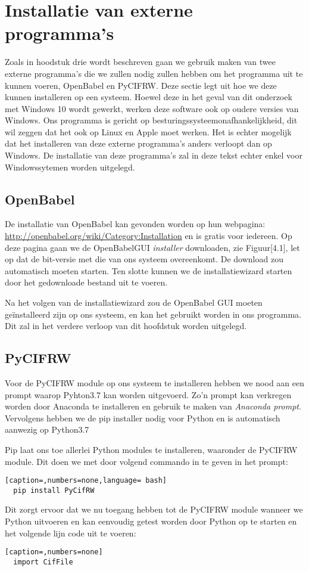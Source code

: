 \section{Installatie van externe programma's}
Zoals in hoodstuk drie wordt beschreven gaan we gebruik maken van twee externe programma's die we zullen nodig zullen hebben om het programma uit te kunnen voeren, OpenBabel en PyCIFRW. Deze sectie legt uit hoe we deze kunnen installeren op een systeem. Hoewel deze in het geval van dit onderzoek met Windows 10 wordt gewerkt, werken deze software ook op oudere versies van Windows. Ons programma is gericht op besturingssysteemonafhankelijkheid, dit wil zeggen dat het ook op Linux en Apple moet werken. Het is echter mogelijk dat het installeren van deze externe programma's anders verloopt dan op Windows. De installatie van deze programma's zal in deze tekst echter enkel voor Windowssytemen worden uitgelegd.

\subsection{OpenBabel}  
De installatie van OpenBabel kan gevonden worden op hun webpagina: \url{http://openbabel.org/wiki/Category:Installation} en is gratis voor iedereen. Op deze pagina gaan we de OpenBabelGUI \textit{installer} downloaden, zie Figuur[4.1], let op dat de bit-versie met die van ons systeem overeenkomt. De download zou automatisch moeten starten. Ten slotte kunnen we de installatiewizard starten door het gedownloade bestand uit te voeren.
\par
Na het volgen van de installatiewizard zou de OpenBabel GUI moeten geïnstalleerd zijn op ons systeem, en kan het gebruikt worden in ons programma. Dit zal in het verdere verloop van dit hoofdstuk worden uitgelegd.

\subsection{PyCIFRW}
Voor de PyCIFRW module op ons systeem te installeren hebben we nood aan een prompt waarop Pyhton3.7 kan worden uitgevoerd. Zo'n prompt kan verkregen worden door Anaconda te installeren en gebruik te maken van \textit{Anaconda prompt}. Vervolgens hebben we de pip installer nodig voor Python en is automatisch aanwezig op Python3.7
\par 
Pip laat ons toe allerlei Python modules te installeren, waaronder de PyCIFRW module. Dit doen we met door volgend commando in te geven in het prompt:
\begin{lstlisting}[caption=,numbers=none,language= bash]
  pip install PyCifRW
\end{lstlisting}
Dit zorgt ervoor dat we nu toegang hebben tot de PyCIFRW module wanneer we Python uitvoeren en kan eenvoudig getest worden door Python op te starten en het volgende lijn code uit te voeren:
\begin{lstlisting}[caption=,numbers=none]
  import CifFile
\end{lstlisting}

